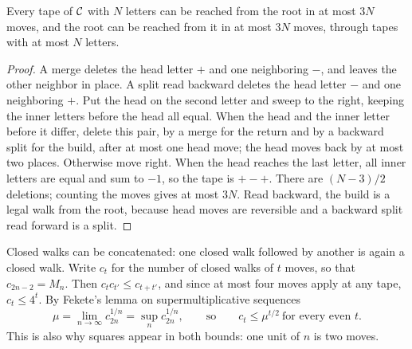 \begin{lemma}\label{lem:sweep}
Every tape of $\mathcal{C}$ with $N$ letters can be reached from the root in at most $3N$ moves, and the root can be reached
from it in at most $3N$ moves, through tapes with at most $N$ letters.
\end{lemma}

\begin{proof}
A merge deletes the head letter $+$ and one neighboring $-$, and leaves the other neighbor in place. A split read
backward deletes the head letter $-$ and one neighboring $+$. Put the head on the second letter and sweep to the right,
keeping the inner letters before the head all equal. When the head and the inner letter before it differ, delete this
pair, by a merge for the return and by a backward split for the build, after at most one head move; the head moves
back by at most two places. Otherwise move right. When the head reaches the last letter, all inner letters are equal
and sum to $-1$, so the tape is $+-+$. There are $(N-3)/2$ deletions; counting the moves gives at most $3N$. Read
backward, the build is a legal walk from the root, because head moves are reversible and a backward split read forward
is a split.
\end{proof}

Closed walks can be concatenated: one closed walk followed by another is again a closed walk. Write $c_t$ for the
number of closed walks of $t$ moves, so that $c_{2n-2}=M_n$. Then $c_tc_{t'}\le c_{t+t'}$, and since at most four moves
apply at any tape, $c_t\le 4^t$. By Fekete's lemma on supermultiplicative sequences
\begin{equation}\label{eq:fekete}
  \mu=\lim_{n\to\infty}c_{2n}^{1/n}=\sup_n c_{2n}^{1/n},\qquad\text{so}\qquad c_t\le\mu^{t/2}\ \text{for every even }t.
\end{equation}
This is also why squares appear in both bounds: one unit of $n$ is two moves.
